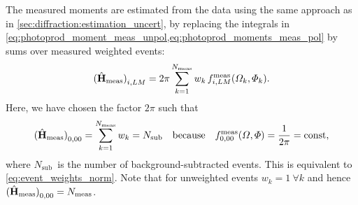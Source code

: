 The measured moments are estimated from the data using the same
approach as in \cref{sec:diffraction:estimation_uncert}, \ie by
replacing the integrals in
\cref{eq:photoprod_moment_meas_unpol,eq:photoprod_moments_meas_pol} by
sums over measured weighted events:
\begin{equation}
  \label{eq:photoprod_moments_meas_estimate_weighted}
  \rBrk[0]{\hat{\vect{H}}_\text{meas}}_{i, L M}
  = 2 \pi \sum_{k = 1}^{N_\text{meas}} w_k\, f_{i, L M}^\text{meas}(\Omega_k, \Phi_k).
\end{equation}
Here, we have chosen the factor $2 \pi$ such that
\begin{equation}
  \label{eq:photoprod_norm_00}
  \rBrk[0]{\hat{\vect{H}}_\text{meas}}_{0, 0 0}
  = \sum_{k = 1}^{N_\text{meas}} w_k
  = N_\text{sub}
  \quad\text{because}\quad
  f_{0, 0 0}^\text{meas}(\Omega, \Phi)
  = \frac{1}{2 \pi}
  = \text{const},
\end{equation}
where $N_\text{sub}$~is the number of background-subtracted events.
This is equivalent to \cref{eq:event_weights_norm}.  Note that for
unweighted events $w_k = 1~ \forall k$ and hence
$\rBrk[0]{\hat{\vect{H}}_\text{meas}}_{0, 0 0} = N_\text{meas}$.

